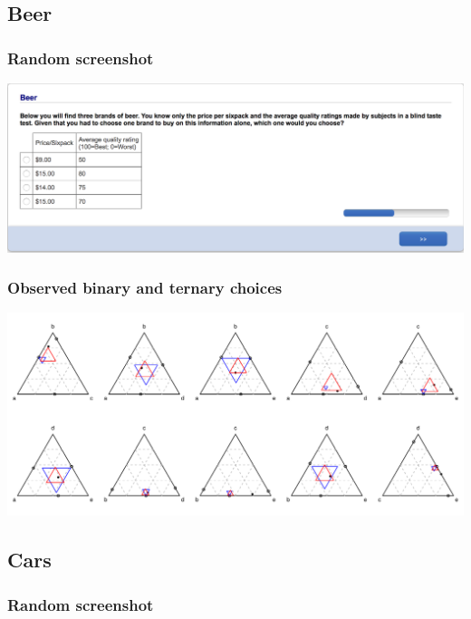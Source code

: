 \documentclass[11pt,letter]{article}
\begin{document}
\pagebreak

\subsection*{Beer}



\subsubsection*{Random screenshot}

\includegraphics[width=15cm]{Population_study_design/screenshot_beer.png}

\subsubsection*{Observed binary and ternary choices}

\includegraphics[width=15cm]{./Population_study_data/Simplexes/beer.pdf}

\pagebreak

\subsection*{Cars}



\subsubsection*{Random screenshot}
\end{document}
